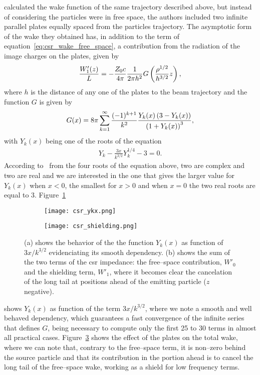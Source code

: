      calculated the wake function of the same trajectory described above, but instead of considering the particles were in free space, the authors included two infinite parallel plates equally spaced from the particles trajectory. The asymptotic form of the wake they obtained has, in addition to the term of equation~\eqref{eq:csr_wake_free_space}, a contribution from the radiation of the image charges on the plates, given by
    \begin{align}\label{eq:csr_wake_shielding}
        \frac{W'_1(z)}{L} = -\frac{Z_0 c}{4\pi}\frac{1}{2\pi h^2} G\left(\frac{\rho^{1/2}}{h^{3/2}}z\right),
    \end{align}
    where $h$ is the distance of any one of the plates to the beam trajectory and the function $G$ is given by
    \begin{align}
        G(x) = 8\pi\sum_{k=1}^\infty \frac{(-1)^{k+1}}{k^2}\frac{Y_k(x)\left(3-Y_k(x)\right)}{\left(1+Y_k(x)\right)^3},
    \end{align}
    with $Y_k(x)$ being one of the roots of the equation
    \begin{align}
        Y_k - \frac{3x}{k^{3/2}}Y_k^{1/4} - 3 = 0.
    \end{align}
    According to~ from the four roots of the equation above, two are complex and two are real and we are interested in the one that gives the larger value for $Y_k(x)$ when $x<0$, the smallest for $x>0$ and when $x=0$ the two real roots are equal to 3. Figure~\ref{fig:csr_ykx}
    \begin{figure}
        \centering
        \begin{subfigure}[c]{0.48\textwidth}
            \centering
            \texttt{[image: csr\_ykx.png]}
            \caption{}
            \label{fig:csr_ykx}
        \end{subfigure}\hfill
        \begin{subfigure}[c]{0.48\textwidth}
            \centering
            \texttt{[image: csr\_shielding.png]}
            \caption{}
            \label{fig:csr_shielding}
        \end{subfigure}
        \caption{(a) shows the behavior of the the function $Y_k(x)$ as function of $3x/k^{3/2}$ evidenciating its smooth dependency. (b) shows the sum of the two terms of the \gls{csr} impedance: the free--space contribution, $W'_0$ and the shielding term, $W'_1$, where it becomes clear the cancelation of the long tail at positions ahead of the emitting particle ($z$ negative).}
    \end{figure}
    shows $Y_k(x)$ as function of the term $3x/k^{3/2}$, where we note a smooth and well behaved dependency, which guarantees a fast convergence of the infinite series that defines $G$, being necessary to compute only the first 25 to 30 terms in almost all practical cases. Figure~\ref{fig:csr_shielding} shows the effect of the plates on the total wake, where we can note that, contrary to the free--space term, it is non--zero behind the source particle and that its contribution in the portion ahead is to cancel the long tail of the free--space wake, working as a shield for low frequency terms.

